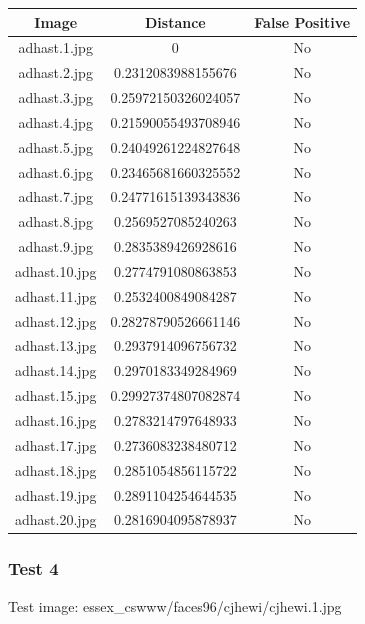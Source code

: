 \documentclass[12pt]{article}
\begin{document}
\begin{center}
\begin{tabular}{ccc}
Image & Distance & False Positive \\
\hline
adhast.1.jpg & 0 & No \\
adhast.2.jpg & 0.2312083988155676 & No \\
adhast.3.jpg & 0.25972150326024057 & No \\
adhast.4.jpg & 0.21590055493708946 & No \\
adhast.5.jpg & 0.24049261224827648 & No \\
adhast.6.jpg & 0.23465681660325552 & No \\
adhast.7.jpg & 0.24771615139343836 & No \\
adhast.8.jpg & 0.2569527085240263 & No \\
adhast.9.jpg & 0.2835389426928616 & No \\
adhast.10.jpg & 0.2774791080863853 & No \\
adhast.11.jpg & 0.2532400849084287 & No \\
adhast.12.jpg & 0.28278790526661146 & No \\
adhast.13.jpg & 0.2937914096756732 & No \\
adhast.14.jpg & 0.2970183349284969 & No \\
adhast.15.jpg & 0.29927374807082874 & No \\
adhast.16.jpg & 0.2783214797648933 & No \\
adhast.17.jpg & 0.2736083238480712 & No \\
adhast.18.jpg & 0.2851054856115722 & No \\
adhast.19.jpg & 0.2891104254644535 & No \\
adhast.20.jpg & 0.2816904095878937 & No \\
\end{tabular}
\end{center}

\subsubsection{Test 4}
Test image: essex\_cswww/faces96/cjhewi/cjhewi.1.jpg
\end{document}
